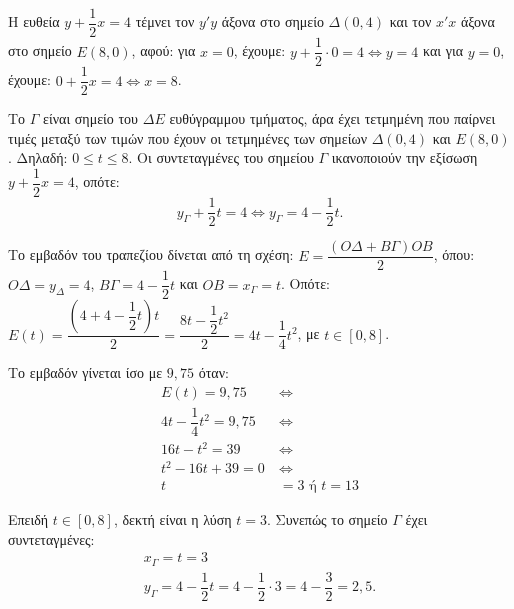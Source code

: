 
\begin{alist}
\item Η ευθεία $y + \dfrac{1}{2}x = 4$ τέμνει τον $y'y$ άξονα στο σημείο $\Delta(0, 4)$ και τον $x'x$ άξονα στο σημείο $E(8, 0)$, αφού:
για $x = 0$, έχουμε: $y + \dfrac{1}{2} \cdot 0 = 4 \Leftrightarrow y = 4$ και
για $y = 0$, έχουμε: $0 + \dfrac{1}{2}x = 4 \Leftrightarrow x = 8$.

\item Το $\Gamma$ είναι σημείο του $\Delta E$ ευθύγραμμου τμήματος, άρα έχει τετμημένη που παίρνει τιμές μεταξύ των τιμών που έχουν οι τετμημένες των σημείων $\Delta(0, 4)$ και $E(8, 0)$. Δηλαδή:
$0 \le t \le 8$.
Οι συντεταγμένες του σημείου $\Gamma$ ικανοποιούν την εξίσωση $y + \dfrac{1}{2}x = 4$, οπότε:
\[y_\Gamma + \dfrac{1}{2}t = 4 \Leftrightarrow y_\Gamma = 4 - \dfrac{1}{2}t.\]

\item Το εμβαδόν του τραπεζίου δίνεται από τη σχέση:
$E = \dfrac{(O\Delta + B\Gamma)OB}{2}$,
όπου: $O\Delta = y_\Delta = 4$, $B\Gamma = 4 - \dfrac{1}{2}t$ και $OB = x_\Gamma = t$.
Οπότε:
$E(t) = \dfrac{\left(4 + 4 - \dfrac{1}{2}t\right)t}{2} = \dfrac{8t - \dfrac{1}{2}t^2}{2} = 4t - \dfrac{1}{4}t^2$, με $t \in [0, 8]$.

\item Το εμβαδόν γίνεται ίσο με $9,75$ όταν:
\begin{align*}
E(t) = 9,75 \ &\Leftrightarrow \\
4t - \dfrac{1}{4}t^2 = 9,75 \ &\Leftrightarrow \\
16t - t^2 = 39 \ &\Leftrightarrow \\
t^2 - 16t + 39 = 0 \ &\Leftrightarrow \\
t &= 3 \text{ ή } t = 13
\end{align*}

Επειδή $t \in [0, 8]$, δεκτή είναι η λύση $t = 3$. Συνεπώς το σημείο $\Gamma$ έχει συντεταγμένες:
\begin{gather*}
x_\Gamma = t = 3 \\
y_\Gamma = 4 - \dfrac{1}{2}t = 4 - \dfrac{1}{2} \cdot 3 = 4 - \dfrac{3}{2} = 2,5.
\end{gather*}
\end{alist}

